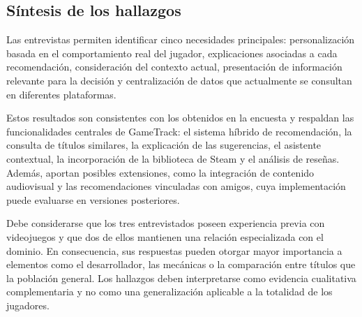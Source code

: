 \subsection{Síntesis de los hallazgos}\label{subsec:sintesis_hallazgos}

Las entrevistas permiten identificar cinco necesidades principales: personalización basada en el comportamiento real del jugador, explicaciones asociadas a cada recomendación, consideración del contexto actual, presentación de información relevante para la decisión y centralización de datos que actualmente se consultan en diferentes plataformas.

Estos resultados son consistentes con los obtenidos en la encuesta y respaldan las funcionalidades centrales de GameTrack: el sistema híbrido de recomendación, la consulta de títulos similares, la explicación de las sugerencias, el asistente contextual, la incorporación de la biblioteca de Steam y el análisis de reseñas. Además, aportan posibles extensiones, como la integración de contenido audiovisual y las recomendaciones vinculadas con amigos, cuya implementación puede evaluarse en versiones posteriores.

Debe considerarse que los tres entrevistados poseen experiencia previa con videojuegos y que dos de ellos mantienen una relación especializada con el dominio. En consecuencia, sus respuestas pueden otorgar mayor importancia a elementos como el desarrollador, las mecánicas o la comparación entre títulos que la población general. Los hallazgos deben interpretarse como evidencia cualitativa complementaria y no como una generalización aplicable a la totalidad de los jugadores.

